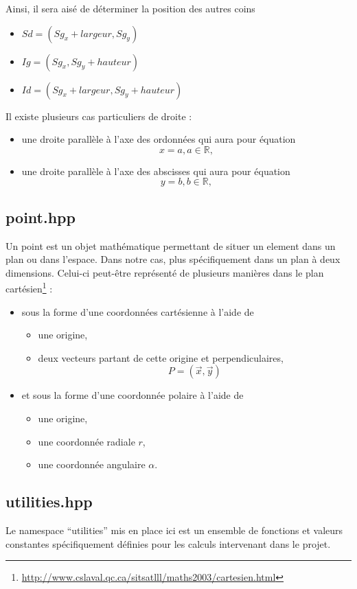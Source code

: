 \documentclass[a4paper,11pt]{report}
\begin{document}
Ainsi, il sera aisé de déterminer la position des autres coins 
\begin{itemize}
	\item $Sd = (Sg_x + largeur, Sg_y)$
	\item $Ig = (Sg_x , Sg_y + hauteur)$
	\item $Id = (Sg_x + largeur, Sg_y + hauteur)$
\end{itemize}

Il existe plusieurs cas particuliers de droite :
\begin{itemize}
	\item une droite parallèle à l'axe des ordonnées qui aura pour équation
		$$x = a, a \in \mathbb{R}, $$
	\item une droite parallèle à l'axe des abscisses qui aura pour équation
		$$y = b, b \in \mathbb{R}, $$
\end{itemize}
\subsection[Point]{point.hpp}
Un point est un objet mathématique permettant de situer un element dans un plan
ou dans l'espace. Dans notre cas, plus spécifiquement dans un plan à deux
dimensions. Celui-ci peut-être représenté de plusieurs manières dans le plan 
cartésien\footnote{\url{http://www.cslaval.qc.ca/sitsatlll/maths2003/cartesien.html}} : 
\begin{itemize}
	\item sous la forme d'une coordonnées cartésienne à l'aide de 
		\begin{itemize}
			\item une origine,
			\item deux vecteurs partant de cette origine et perpendiculaires,
				$$P = (\vec{x}, \vec{y})$$
		\end{itemize}
	\item et sous la forme d'une coordonnée polaire à l'aide de
		\begin{itemize}
			\item une origine,
			\item une coordonnée radiale $r$,
			\item une coordonnée angulaire $\alpha$.
		\end{itemize}
\end{itemize}
\subsection[Utilitaire]{utilities.hpp}
Le namespace ``utilities'' mis en place ici est un ensemble de fonctions et valeurs
constantes spécifiquement définies pour les calculs intervenant dans le projet.
\end{document}
